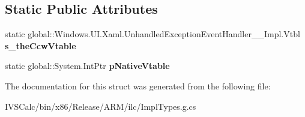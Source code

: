 \subsection*{Static Public Attributes}
\begin{DoxyCompactItemize}
\item 
\mbox{\label{struct_windows_1_1_u_i_1_1_xaml_1_1_unhandled_exception_event_handler_____impl_1_1_vtbl_a70efcae56c0a618db36d142a0ed1f149}} 
static global\+::\+Windows.\+U\+I.\+Xaml.\+Unhandled\+Exception\+Event\+Handler\+\_\+\+\_\+\+Impl.\+Vtbl {\bfseries s\+\_\+the\+Ccw\+Vtable}
\item 
\mbox{\label{struct_windows_1_1_u_i_1_1_xaml_1_1_unhandled_exception_event_handler_____impl_1_1_vtbl_a706ac1b0f069db9fa4282e9a356ca8c4}} 
static global\+::\+System.\+Int\+Ptr {\bfseries p\+Native\+Vtable}
\end{DoxyCompactItemize}


The documentation for this struct was generated from the following file\+:\begin{DoxyCompactItemize}
\item 
I\+V\+S\+Calc/bin/x86/\+Release/\+A\+R\+M/ilc/Impl\+Types.\+g.\+cs\end{DoxyCompactItemize}
